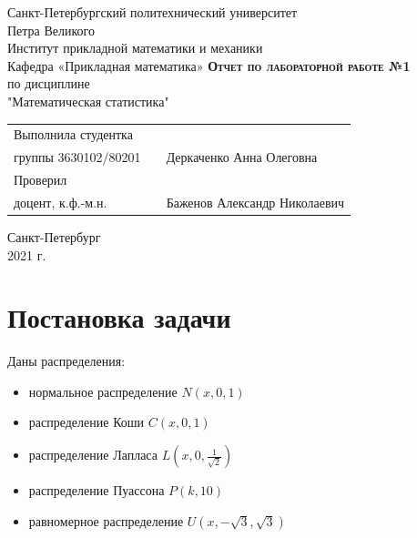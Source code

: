 ﻿\documentclass[12pt,a4paper]{article}
\begin{document}
    \begin{titlepage}
        \begin{center}
            \large
            Санкт-Петербургский политехнический университет\\Петра Великого\\
            \vspace{0.5cm}
            Институт прикладной математики и механики\\
            \vspace{0.25cm}
            Кафедра «Прикладная математика»
            \vfill
            \textsc{\LARGE\textbf{Отчет по лабораторной работе №1}}\\[5mm]
            \Large
            по дисциплине\\"Математическая статистика"
        \end{center}
        \vfill
        \begin{tabular}{l p{} l}
            Выполнила студентка\\группы 3630102/80201 && Деркаченко Анна Олеговна
            \vspace{0.25cm}
            \\Проверил\\доцент, к.ф.-м.н. && Баженов Александр Николаевич
        \end{tabular}
        \vfill
        \begin{center}
            Санкт-Петербург\\2021 г.
        \end{center}
    \end{titlepage}

\newpage
\begin{center}
    \tableofcontents
    \setcounter{page}{2}
\end{center}
\newpage
\begin{center}
    \listoffigures
\end{center}

\newpage
\section{Постановка задачи}
Даны распределения:
\begin{itemize}
    \item нормальное распределение $N(x,0,1)$
    \item распределение Коши $C(x,0,1)$
    \item распределение Лапласа $L(x,0,\frac{1}{\sqrt{2}})$
    \item распределение Пуассона $P(k,10)$
    \item равномерное распределение $U(x,-\sqrt{3},\sqrt{3})$
\end{itemize}
\end{document}
